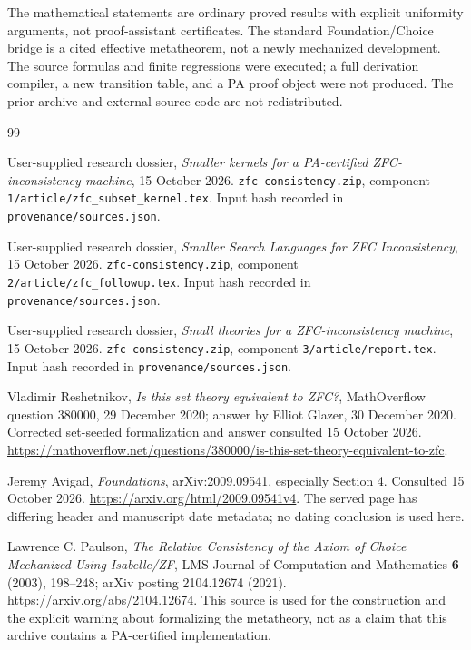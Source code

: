 \documentclass[11pt,letterpaper]{article}
\theoremstyle{definition}\newtheorem{definition}[theorem]{Definition}
\theoremstyle{remark}\newtheorem{remark}[theorem]{Remark}
\begin{document}
The mathematical statements are ordinary proved results with explicit
uniformity arguments, not proof-assistant certificates. The standard
Foundation/Choice bridge is a cited effective metatheorem, not a newly
mechanized development. The source formulas and finite regressions were
executed; a full derivation compiler, a new transition table, and a PA
proof object were not produced. The prior archive and external source
code are not redistributed.

\begin{thebibliography}{99}

User-supplied research dossier, \emph{Smaller kernels for a PA-certified
ZFC-inconsistency machine}, 15 October 2026.
\texttt{zfc-consistency.zip}, component
\texttt{1/article/zfc\_subset\_kernel.tex}.
Input hash recorded in \texttt{provenance/sources.json}.

User-supplied research dossier, \emph{Smaller Search Languages for ZFC
Inconsistency}, 15 October 2026.
\texttt{zfc-consistency.zip}, component
\texttt{2/article/zfc\_followup.tex}.
Input hash recorded in \texttt{provenance/sources.json}.

User-supplied research dossier, \emph{Small theories for a
ZFC-inconsistency machine}, 15 October 2026.
\texttt{zfc-consistency.zip}, component \texttt{3/article/report.tex}.
Input hash recorded in \texttt{provenance/sources.json}.

Vladimir Reshetnikov, \emph{Is this set theory equivalent to ZFC?},
MathOverflow question 380000, 29 December 2020; answer by Elliot Glazer,
30 December 2020. Corrected set-seeded formalization and answer consulted
15 October 2026.
\url{https://mathoverflow.net/questions/380000/is-this-set-theory-equivalent-to-zfc}.

Jeremy Avigad, \emph{Foundations}, arXiv:2009.09541, especially Section 4.
Consulted 15 October 2026.
\url{https://arxiv.org/html/2009.09541v4}.
The served page has differing header and manuscript date metadata;
no dating conclusion is used here.

Lawrence C. Paulson, \emph{The Relative Consistency of the Axiom of Choice
Mechanized Using Isabelle/ZF}, LMS Journal of Computation and Mathematics
\textbf{6} (2003), 198--248; arXiv posting 2104.12674 (2021).
\url{https://arxiv.org/abs/2104.12674}.
This source is used for the construction and the explicit warning about
formalizing the metatheory, not as a claim that this archive contains a
PA-certified implementation.


\end{thebibliography}
\end{document}
